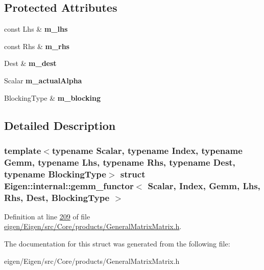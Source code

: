 \subsection*{Protected Attributes}
\begin{DoxyCompactItemize}
\item 
\mbox{\label{struct_eigen_1_1internal_1_1gemm__functor_a41ae29d0d6b753b3f0f6be5244a9a305}} 
const Lhs \& {\bfseries m\+\_\+lhs}
\item 
\mbox{\label{struct_eigen_1_1internal_1_1gemm__functor_afdc505e7e60e3911129b89697613200a}} 
const Rhs \& {\bfseries m\+\_\+rhs}
\item 
\mbox{\label{struct_eigen_1_1internal_1_1gemm__functor_a4ae6cd3d1bb75f6e11b4b21b57c97275}} 
Dest \& {\bfseries m\+\_\+dest}
\item 
\mbox{\label{struct_eigen_1_1internal_1_1gemm__functor_a7403054b4de857243937730e8bc02576}} 
Scalar {\bfseries m\+\_\+actual\+Alpha}
\item 
\mbox{\label{struct_eigen_1_1internal_1_1gemm__functor_a7f0d2e02befefdfeafc62b475aaf8ee2}} 
Blocking\+Type \& {\bfseries m\+\_\+blocking}
\end{DoxyCompactItemize}


\subsection{Detailed Description}
\subsubsection*{template$<$typename Scalar, typename Index, typename Gemm, typename Lhs, typename Rhs, typename Dest, typename Blocking\+Type$>$\newline
struct Eigen\+::internal\+::gemm\+\_\+functor$<$ Scalar, Index, Gemm, Lhs, Rhs, Dest, Blocking\+Type $>$}



Definition at line \hyperlink{eigen_2_eigen_2src_2_core_2products_2_general_matrix_matrix_8h_source_l00209}{209} of file \hyperlink{eigen_2_eigen_2src_2_core_2products_2_general_matrix_matrix_8h_source}{eigen/\+Eigen/src/\+Core/products/\+General\+Matrix\+Matrix.\+h}.



The documentation for this struct was generated from the following file\+:\begin{DoxyCompactItemize}
\item 
eigen/\+Eigen/src/\+Core/products/\+General\+Matrix\+Matrix.\+h\end{DoxyCompactItemize}
